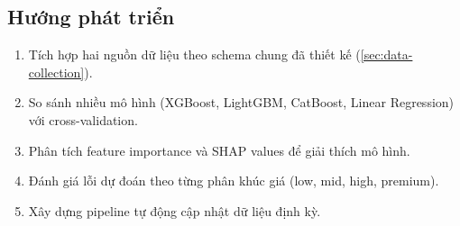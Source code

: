 \subsection{Hướng phát triển}

\begin{enumerate}[noitemsep]
    \item Tích hợp hai nguồn dữ liệu theo schema chung đã thiết kế (\cref{sec:data-collection}).
    \item So sánh nhiều mô hình (XGBoost, LightGBM, CatBoost, Linear Regression) với cross-validation.
    \item Phân tích feature importance và SHAP values để giải thích mô hình.
    \item Đánh giá lỗi dự đoán theo từng phân khúc giá (low, mid, high, premium).
    \item Xây dựng pipeline tự động cập nhật dữ liệu định kỳ.
\end{enumerate}
